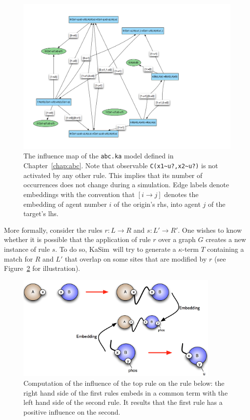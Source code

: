 \documentclass[11pt]{book}
\def\KaSim{\textsf{KaSim}}
\def\int{\hbox{\texttt{\~}}}
\def\ttt#1{\texttt{#1}}
\def\rar{\rightarrow}
\def\ka{\kappa}
\begin{document}
\begin{figure}[htbp] %
   \centering
   \includegraphics[width=19cm]{img/abc-im.png} 
   \caption{The influence map of the \ttt{abc.ka} model defined in Chapter~\ref{chap:abc}. Note that observable \ttt{C(x1\int u?,x2\int u?)} is not activated by any other rule. This implies that its number of occurrences does not change during a simulation. Edge labels denote embeddings with the convention that $[i\rar j]$ denotes the embedding of agent number $i$ of the origin's rhs, into agent $j$ of the target's lhs.}
   \label{fig:abc-im}
\end{figure}

More formally, consider the rules $r:L\rar R$ and $s:L'\rar R'$. One wishes to know whether it is possible that the application of rule $r$ over a graph $G$ creates a new instance of rule $s$. To do so, \KaSim~will try to generate a $\ka$-term $T$ containing a match for $R$ and $L'$ that overlap on some sites that are modified by $r$ (see Figure~\ref{fig:im} for illustration).

\begin{figure}[htbp] %
   \centering
   \includegraphics[width=10cm]{img/im.png} 
   \caption{Computation of the influence of the top rule on the rule below: the right hand side of the first rules embeds in a common term with the left hand side of the second rule. It results that the first rule has a positive influence on the second.}
   \label{fig:im}
\end{figure}
\end{document}
